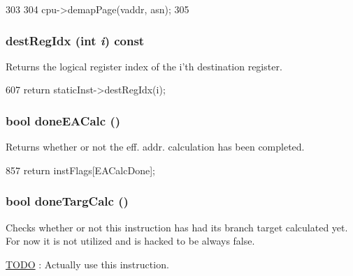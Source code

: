 \begin{DoxyCode}
303     {
304         cpu->demapPage(vaddr, asn);
305     }
\end{DoxyCode}
\hypertarget{classBaseDynInst_ae5a1a6d72f40f715253b91e32b3caad2}{
\subsubsection[{destRegIdx}]{ destRegIdx (int {\em i}) const}}
\label{classBaseDynInst_ae5a1a6d72f40f715253b91e32b3caad2}
Returns the logical register index of the i'th destination register. 


\begin{DoxyCode}
607 { return staticInst->destRegIdx(i); }
\end{DoxyCode}
\hypertarget{classBaseDynInst_a2f1c9119ee950f8afc730ea9d6e92d84}{
\subsubsection[{doneEACalc}]{\setlength{\rightskip}{0pt plus 5cm}bool doneEACalc ()}}
\label{classBaseDynInst_a2f1c9119ee950f8afc730ea9d6e92d84}
Returns whether or not the eff. addr. calculation has been completed. 


\begin{DoxyCode}
857 { return instFlags[EACalcDone]; }
\end{DoxyCode}
\hypertarget{classBaseDynInst_a9a56f3bdfd0d5b331356265c62556516}{
\subsubsection[{doneTargCalc}]{\setlength{\rightskip}{0pt plus 5cm}bool doneTargCalc ()}}
\label{classBaseDynInst_a9a56f3bdfd0d5b331356265c62556516}
Checks whether or not this instruction has had its branch target calculated yet. For now it is not utilized and is hacked to be always false. \begin{Desc}
\item[\hyperlink{todo__todo000015}{TODO}]: Actually use this instruction. \end{Desc}



